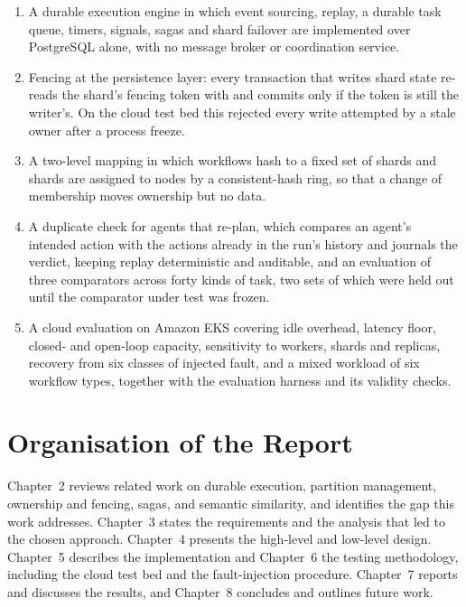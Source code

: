\begin{enumerate}[leftmargin=*, itemsep=2pt]
  \item A durable execution engine in which event sourcing, replay, a durable
    task queue, timers, signals, sagas and shard failover are implemented over
    PostgreSQL alone, with no message broker or coordination service.
  \item Fencing at the persistence layer: every transaction that writes shard
    state re-reads the shard's fencing token with 
    and commits only if the token is still the writer's. On the cloud test bed
    this rejected every write attempted by a stale owner after a process
    freeze.
  \item A two-level mapping in which workflows hash to a fixed set of shards
    and shards are assigned to nodes by a consistent-hash ring, so that a
    change of membership moves ownership but no data.
  \item A duplicate check for agents that re-plan, which compares an agent's
    intended action with the actions already in the run's history and
    journals the verdict, keeping replay deterministic and auditable, and an
    evaluation of three comparators across forty kinds of task, two sets of
    which were held out until the comparator under test was frozen.
  \item A cloud evaluation on Amazon EKS covering idle overhead, latency
    floor, closed- and open-loop capacity, sensitivity to workers, shards and
    replicas, recovery from six classes of injected fault, and a mixed
    workload of six workflow types, together with the evaluation harness and
    its validity checks.
\end{enumerate}

\section{Organisation of the Report}

Chapter~2 reviews related work on durable execution, partition management,
ownership and fencing, sagas, and semantic similarity, and identifies the gap
this work addresses. Chapter~3 states the requirements and the analysis that
led to the chosen approach. Chapter~4 presents the high-level and low-level
design. Chapter~5 describes the implementation and Chapter~6 the testing
methodology, including the cloud test bed and the fault-injection procedure.
Chapter~7 reports and discusses the results, and Chapter~8 concludes and
outlines future work.
